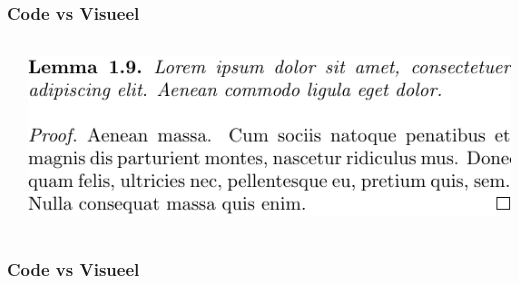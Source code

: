\documentclass[../presentatie.tex]{subfiles}
\def\named#1{}
\begin{document}
    \begin{frame}
        \frametitle{Code vs Visueel}
        \begin{columns}
            \begin{column}{0.5\textwidth}
            \end{column}
            \begin{column}{0.5\textwidth}
                \includegraphics[width=\linewidth,height=0.8\textheight,keepaspectratio]{assets/1_Inleiding/latexRepeatEl.pdf}
            \end{column}
        \end{columns}
    \end{frame}

    \let\frameselection\somethingundefined
    
    \named{intro-visueelcomp-wordugly}
    
    \ifx\frameselection\somethingundefined
        \def\frameselection{1-}
    \fi
    
    \def\pasteframeselection#1{\begin{frame}<#1>}%
    \expandafter\pasteframeselection\expandafter{\frameselection}%
        \frametitle{Code vs Visueel}
    
\end{document}
